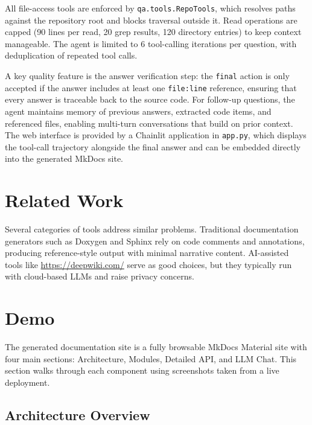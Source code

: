 \documentclass[10pt,twocolumn]{article}
\begin{document}
All file-access tools are enforced by \texttt{qa.tools.RepoTools}, which resolves paths against the repository root and blocks traversal outside it. Read operations are capped (90 lines per read, 20 grep results, 120 directory entries) to keep context manageable. The agent is limited to 6 tool-calling iterations per question, with deduplication of repeated tool calls.

A key quality feature is the answer verification step: the \texttt{final} action is only accepted if the answer includes at least one \texttt{file:line} reference, ensuring that every answer is traceable back to the source code. For follow-up questions, the agent maintains memory of previous answers, extracted code items, and referenced files, enabling multi-turn conversations that build on prior context. The web interface is provided by a Chainlit application in \texttt{app.py}, which displays the tool-call trajectory alongside the final answer and can be embedded directly into the generated MkDocs site.

\section{Related Work}

Several categories of tools address similar problems. Traditional documentation generators such as Doxygen and Sphinx rely on code comments and annotations, producing reference-style output with minimal narrative content. AI-assisted tools like \url{https://deepwiki.com/} serve as good choices, but they typically run with cloud-based LLMs and raise privacy concerns. 

\section{Demo}

The generated documentation site is a fully browsable MkDocs Material site with four main sections: Architecture, Modules, Detailed API, and LLM Chat. This section walks through each component using screenshots taken from a live deployment.

\subsection{Architecture Overview}
\end{document}
